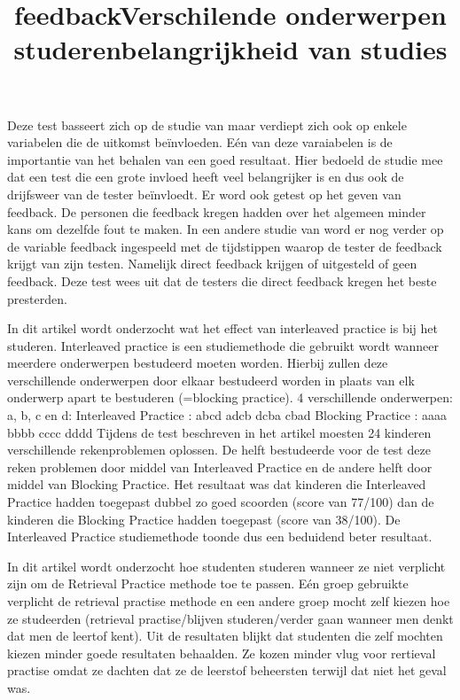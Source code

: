 \documentclass{hogent-article}
\begin{document}
	\title{feedback}
	Deze test basseert zich op de studie van \autocite{brame2015test} maar verdiept zich ook op enkele variabelen die de uitkomst beïnvloeden. Eén van deze varaiabelen is de importantie van het behalen van een goed resultaat. Hier bedoeld de studie mee dat een test die een grote invloed heeft veel belangrijker is en dus ook de drijfsweer van de tester beïnvloedt. Er word ook getest op het geven van feedback. De personen die feedback kregen hadden over het algemeen minder kans om dezelfde fout te maken.
	In een andere studie van \autocite{roediger2011critical} word er nog verder op de variable feedback ingespeeld met de tijdstippen waarop de tester de feedback krijgt van zijn testen. Namelijk direct feedback krijgen of uitgesteld of geen feedback. Deze test wees uit dat de testers die direct feedback kregen het beste presterden.
    
    \title{Verschilende onderwerpen studeren}
    In dit artikel \autocite{taylor2010effects} wordt onderzocht wat het effect van interleaved practice is bij het studeren. Interleaved practice is een studiemethode die gebruikt wordt wanneer meerdere onderwerpen bestudeerd moeten worden. Hierbij zullen deze verschillende onderwerpen door elkaar bestudeerd worden in plaats van elk onderwerp apart te bestuderen (=blocking practice).
    4 verschillende onderwerpen: a, b, c en d:
    Interleaved Practice	: abcd adcb dcba cbad
    Blocking Practice	: aaaa bbbb cccc dddd
    Tijdens de test beschreven in het artikel moesten 24 kinderen verschillende rekenproblemen oplossen. De helft bestudeerde voor de test deze reken problemen door middel van Interleaved Practice en de andere helft door middel van Blocking Practice. Het resultaat was dat kinderen die Interleaved Practice hadden toegepast dubbel zo goed scoorden (score van 77/100) dan de kinderen die Blocking Practice hadden toegepast (score van 38/100). De Interleaved Practice studiemethode toonde dus een beduidend beter resultaat.
    
    \title{belangrijkheid van studies}
    In dit artikel \autocite{karpicke2009metacognitive} wordt onderzocht hoe studenten studeren wanneer ze niet verplicht zijn om de Retrieval Practice methode toe te passen. Eén groep gebruikte verplicht de retrieval practise methode en een andere groep mocht zelf kiezen hoe ze studeerden (retrieval practise/blijven studeren/verder gaan wanneer men denkt dat men de leertof kent). Uit de resultaten blijkt dat studenten die zelf mochten kiezen minder goede resultaten behaalden. Ze kozen minder vlug voor rertieval practise omdat ze dachten dat ze de leerstof beheersten terwijl dat niet het geval was. 
     
\end{document}
